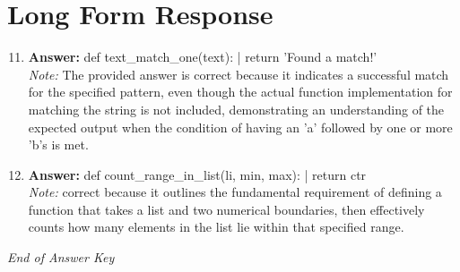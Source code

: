 \documentclass[12pt]{article}
\begin{document}
\section*{Long Form Response}
\begin{enumerate}[label=\arabic*.]
\setcounter{enumi}{10}
\item \textbf{Answer:} def text\_match\_one(text): | return 'Found a match!'
\\ \textit{Note:} The provided answer is correct because it indicates a successful match for the specified pattern, even though the actual function implementation for matching the string is not included, demonstrating an understanding of the expected output when the condition of having an 'a' followed by one or more 'b's is met.
\item \textbf{Answer:} def count\_range\_in\_list(li, min, max): | return ctr
\\ \textit{Note:} correct because it outlines the fundamental requirement of defining a function that takes a list and two numerical boundaries, then effectively counts how many elements in the list lie within that specified range.
\end{enumerate}

\vfill
\noindent\textit{End of Answer Key}
\end{document}
